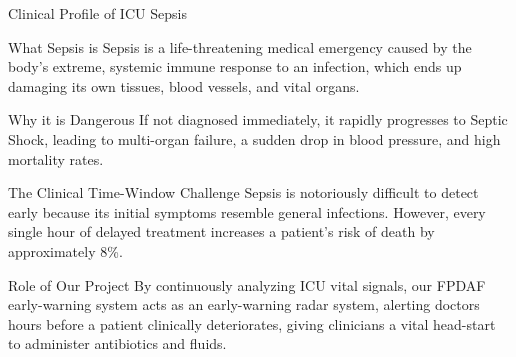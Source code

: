 \documentclass[aspectratio=169, 11pt]{beamer}
\begin{document}
\begin{frame}{Clinical Profile of ICU Sepsis}
    \begin{block}{What Sepsis is}
        \scriptsize
        Sepsis is a life-threatening medical emergency caused by the body's extreme, systemic immune response to an infection, which ends up damaging its own tissues, blood vessels, and vital organs.
    \end{block}
    
    \begin{block}{Why it is Dangerous}
        \scriptsize
        If not diagnosed immediately, it rapidly progresses to Septic Shock, leading to multi-organ failure, a sudden drop in blood pressure, and high mortality rates.
    \end{block}
    
    \begin{block}{The Clinical Time-Window Challenge}
        \scriptsize
        Sepsis is notoriously difficult to detect early because its initial symptoms resemble general infections. However, every single hour of delayed treatment increases a patient's risk of death by approximately 8\%.
    \end{block}
    
    \begin{alertblock}{Role of Our Project}
        \scriptsize
        By continuously analyzing ICU vital signals, our FPDAF early-warning system acts as an early-warning radar system, alerting doctors hours before a patient clinically deteriorates, giving clinicians a vital head-start to administer antibiotics and fluids.
    \end{alertblock}
\end{frame}
\end{document}
